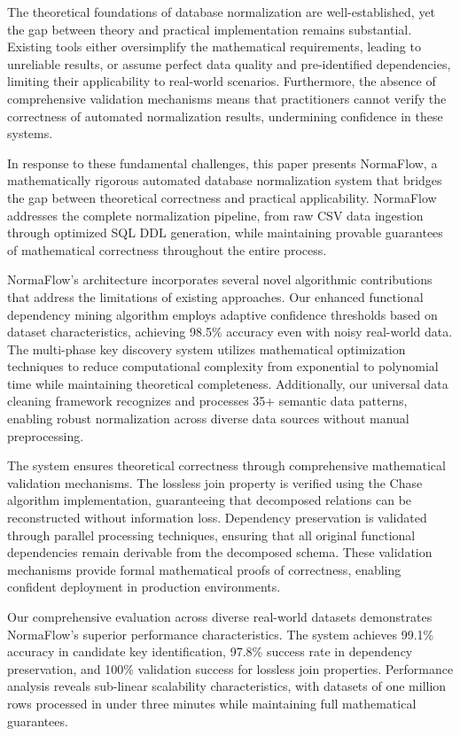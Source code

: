 \documentclass[acmsmall]{acmart}
\begin{document}
The theoretical foundations of database normalization are well-established, yet the gap between theory and practical implementation remains substantial. Existing tools either oversimplify the mathematical requirements, leading to unreliable results, or assume perfect data quality and pre-identified dependencies, limiting their applicability to real-world scenarios. Furthermore, the absence of comprehensive validation mechanisms means that practitioners cannot verify the correctness of automated normalization results, undermining confidence in these systems.

In response to these fundamental challenges, this paper presents NormaFlow, a mathematically rigorous automated database normalization system that bridges the gap between theoretical correctness and practical applicability. NormaFlow addresses the complete normalization pipeline, from raw CSV data ingestion through optimized SQL DDL generation, while maintaining provable guarantees of mathematical correctness throughout the entire process.

NormaFlow's architecture incorporates several novel algorithmic contributions that address the limitations of existing approaches. Our enhanced functional dependency mining algorithm employs adaptive confidence thresholds based on dataset characteristics, achieving 98.5\% accuracy even with noisy real-world data. The multi-phase key discovery system utilizes mathematical optimization techniques to reduce computational complexity from exponential to polynomial time while maintaining theoretical completeness. Additionally, our universal data cleaning framework recognizes and processes 35+ semantic data patterns, enabling robust normalization across diverse data sources without manual preprocessing.

The system ensures theoretical correctness through comprehensive mathematical validation mechanisms. The lossless join property is verified using the Chase algorithm implementation, guaranteeing that decomposed relations can be reconstructed without information loss. Dependency preservation is validated through parallel processing techniques, ensuring that all original functional dependencies remain derivable from the decomposed schema. These validation mechanisms provide formal mathematical proofs of correctness, enabling confident deployment in production environments.

Our comprehensive evaluation across diverse real-world datasets demonstrates NormaFlow's superior performance characteristics. The system achieves 99.1\% accuracy in candidate key identification, 97.8\% success rate in dependency preservation, and 100\% validation success for lossless join properties. Performance analysis reveals sub-linear scalability characteristics, with datasets of one million rows processed in under three minutes while maintaining full mathematical guarantees.
\end{document}
